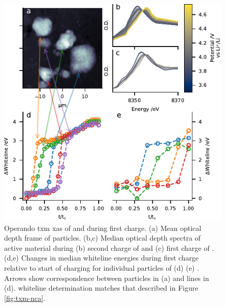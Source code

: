 \documentclass{WileyMSP-template}
\begin{document}
\begin{figure}[!h]
  \includegraphics{figures/nmc_txm.pdf}
  \caption{Operando \gls{txm} \gls{xas} of \nmc[333]{} and \nmc[532]{}
    during first charge. (a) Mean optical depth frame of \nmc[333]{}
    particles. (b,c) Median optical depth spectra of active material
    during (b) second charge of \nmc[333]{} and (c) first charge of
    \nmc[532]{}. (d,e) Changes in median whiteline energies during
    first charge relative to start of charging for individual
    particles of (d) \nmc[333]{} (e) \nmc[532]{}. Arrows show
    correspondence between particles in (a) and lines in
    (d). \textDelta{}whiteline determination matches that described in
    Figure \ref{fig:txm-nca}.}
  \label{fig:txm-nmc}
\end{figure}
\end{document}
